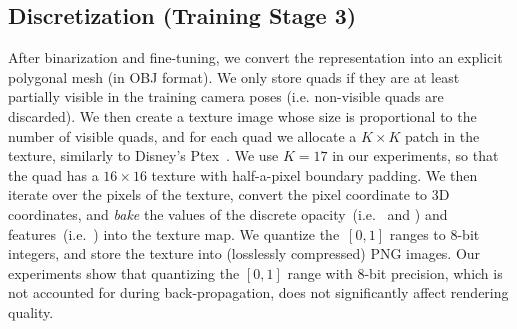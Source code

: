 \subsection{Discretization (Training Stage 3)}
\label{sec:stage3}
After binarization and fine-tuning, we convert the representation into an explicit polygonal mesh (in OBJ format).
We only store quads if they are at least partially visible in the training camera poses (i.e. non-visible quads are discarded).
We then create a texture image whose size is proportional to the number of visible quads, and for each quad we allocate a $K{\times}K$ patch in the texture, similarly to Disney's Ptex~\cite{burley2008ptex}.
We use $K{=}17$ in our experiments, so that the quad has a $16{\times}16$ texture with half-a-pixel boundary padding.
We then iterate over the pixels of the texture, convert the pixel coordinate to 3D coordinates, and \textit{bake} the values of the discrete opacity~(i.e.~ and ) and features~(i.e.~) into the texture map.
We quantize the~$[0,1]$ ranges to 8-bit integers, and store the texture into (losslessly compressed) PNG images.
Our experiments show that quantizing the $[0,1]$ range with 8-bit precision, which is not accounted for during back-propagation, does not significantly affect rendering quality.


